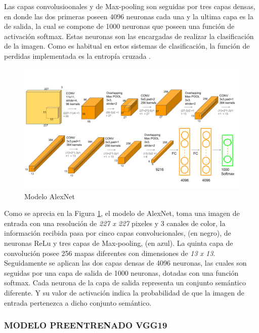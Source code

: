 			
			Las capas convolusioonales y de Max-pooling son seguidas por tres capas densas, en donde las dos primeras poseen 4096 neuronas cada una y la ultima capa es la de salida, la cual se compone de 1000 neuronas que poseen una función de activación softmax. Estas neuronas son las encargadas de realizar la clasificación de la imagen. Como es habitual en estos sistemas de clasificación, la función de perdidas implementada es la entropía cruzada \cite{ref_1}.\\
			
			\newpage
			
			\begin{figure}[ht]
				\centering
				\includegraphics[scale=0.4]{Figs/5.png}
				\caption{Modelo AlexNet}
				\label{fig:AlexNet}
			\end{figure}
			
			Como se aprecia en la Figura \ref{fig:AlexNet}, el modelo de AlexNet, toma una imagen de entrada con una resolución de \textit{227 x 227} pixeles y 3 canales de color, la información recibida pasa por cinco capas convolucionales, (en negro), de neuronas ReLu y tres capas de Max-pooling, (en azul). La quinta capa de convolución posee 256 mapas diferentes con dimensiones de \textit{13 x 13}. Seguidamente se aplican las dos capas densas de 4096 neuronas, las cuales son seguidas por una capa de salida de 1000 neuronas, dotadas con una función softmax. Cada neurona de la capa de salida representa un conjunto semántico diferente. Y su valor de activación indica la probabilidad de que la imagen de entrada pertenezca a dicho conjunto semántico.\\


			\subsubsection{\MakeUppercase{Modelo preentrenado VGG19}}
			

